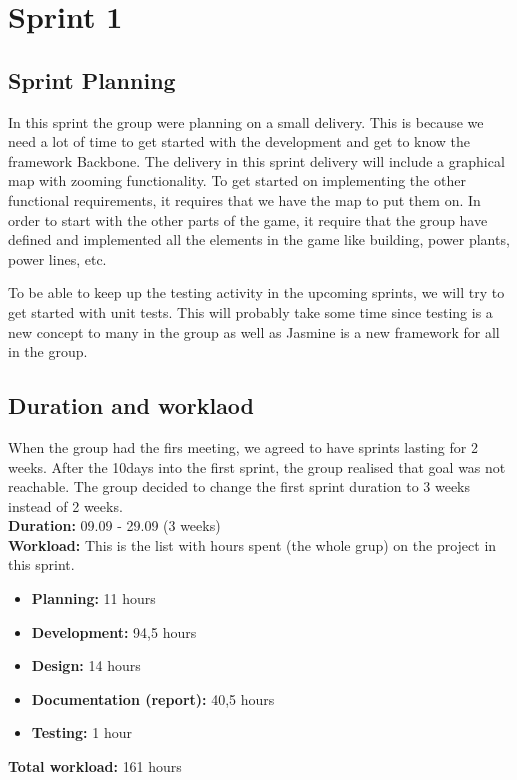 \section{Sprint 1}

\subsection{Sprint Planning}
	In this sprint the group were planning on a small delivery. This is because we need a lot of time to get started with the development and get to know the framework Backbone. The delivery in this sprint delivery will include a graphical map with zooming functionality. To get started on implementing the other functional requirements, it requires that we have the map to put them on. 
	In order to start with the other parts of the game, it require that the group have defined and implemented all the elements in the game like building, power plants, power lines, etc.

	To be able to keep up the testing activity in the upcoming sprints, we will try to get started with unit tests. This will probably take some time since testing is a new concept to many in the group as well as Jasmine is a new framework for all in the group. 

\subsection{Duration and worklaod}
	When the group had the firs meeting, we agreed to have sprints lasting for 2 weeks.
	After the 10days into the first sprint, the group realised that goal was not reachable.
	The group decided to change the first sprint duration to 3 weeks instead of 2 weeks. \\

	{\bf Duration:} 09.09 - 29.09 (3 weeks)\\
	{\bf Workload:} This is the list with hours spent (the whole grup) on the project in this sprint.
	\begin{itemize}
		\item {\bf Planning:} 11 hours
		\item {\bf Development:} 94,5 hours
		\item {\bf Design:} 14 hours
		\item {\bf Documentation (report):} 40,5 hours
		\item {\bf Testing:} 1 hour
	\end{itemize}
	{\bf Total workload: } 161 hours \\
	
